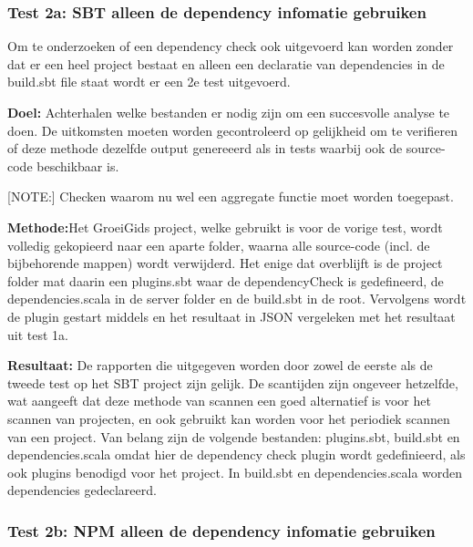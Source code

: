 \subsubsection{Test 2a: SBT alleen de dependency infomatie gebruiken}
Om te onderzoeken of een dependency check ook uitgevoerd kan worden zonder dat er een heel project bestaat en alleen een declaratie van dependencies in de build.sbt file staat wordt er een 2e test uitgevoerd.

\textbf{Doel:} Achterhalen welke bestanden er nodig zijn om een succesvolle analyse te doen. De uitkomsten moeten worden gecontroleerd op gelijkheid om te verifieren of deze methode dezelfde output genereeerd als in tests waarbij ook de source-code beschikbaar is.

[NOTE:] Checken waarom nu wel een aggregate functie moet worden toegepast.

\textbf{Methode:}Het GroeiGids project, welke gebruikt is voor de vorige test, wordt volledig gekopieerd naar een aparte folder, waarna alle source-code (incl. de bijbehorende mappen) wordt verwijderd. Het enige dat overblijft is de project folder mat daarin een plugins.sbt waar de dependencyCheck is gedefineerd, de dependencies.scala in de server folder en de build.sbt in de root. Vervolgens wordt de plugin gestart middels  en het resultaat in JSON vergeleken met het resultaat uit test 1a.

\textbf{Resultaat:} De rapporten die uitgegeven worden door zowel de eerste als de tweede test op het SBT project zijn gelijk. De scantijden zijn ongeveer hetzelfde, wat aangeeft dat deze methode van scannen een goed alternatief is voor het scannen van projecten, en ook gebruikt kan worden voor het periodiek scannen van een project. Van belang zijn de volgende bestanden: plugins.sbt, build.sbt en dependencies.scala omdat hier de dependency check plugin wordt gedefinieerd, als ook plugins benodigd voor het project. In build.sbt en dependencies.scala worden dependencies gedeclareerd.


\subsubsection{Test 2b: NPM alleen de dependency infomatie gebruiken}

